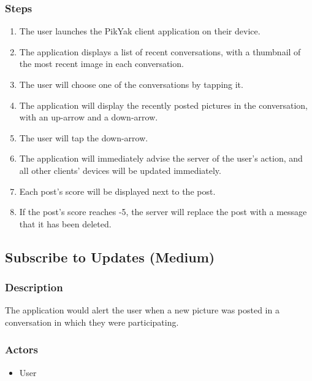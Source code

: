 \documentclass[11pt]{scrartcl}
\begin{document}
        \subsubsection{Steps}
            \begin{enumerate}
                \item The user launches the PikYak client application on their device.
                \item The application displays a list of recent conversations, with a thumbnail of the most recent image in each conversation.
                \item The user will choose one of the conversations by tapping it.
                \item The application will display the recently posted pictures in the conversation, with an up-arrow and a down-arrow.
                \item The user will tap the down-arrow.
                \item The application will immediately advise the server of the user's action, and all other clients' devices will be updated immediately.
                \item Each post's score will be displayed next to the post.
                \item If the post's score reaches -5, the server will replace the post with a message that it has been deleted.
            \end{enumerate}

    \subsection{Subscribe to Updates (Medium)}
        \subsubsection{Description}
            The application would alert the user when a new picture was posted in a conversation in which they were participating.
        \subsubsection{Actors}
            \begin{itemize}
                \item User
            \end{itemize}
\end{document}
